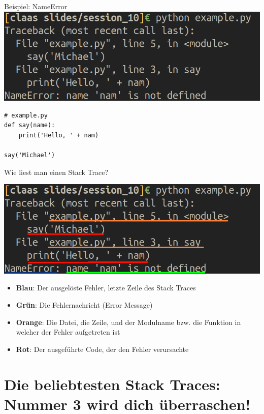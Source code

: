\begin{frame}[fragile]{Beispiel: NameError}
\includegraphics[width=\textwidth]{stack_trace_example.png}
\begin{lstlisting}
# example.py
def say(name):
    print('Hello, ' + nam)

say('Michael')
\end{lstlisting}
\end{frame}

\begin{frame}[fragile]{Wie liest man einen Stack Trace?}
\begin{center}
\includegraphics[width=.9\textwidth]{stack_trace_example_colored.png}
\end{center}
\begin{itemize}
    \item \textbf{Blau}: Der ausgelöste Fehler, letzte Zeile des Stack Traces
    \item \textbf{Grün}: Die Fehlernachricht (Error Message)
    \item \textbf{Orange}: Die Datei, die Zeile, und der Modulname bzw. die Funktion in welcher der Fehler aufgetreten ist
    \item \textbf{Rot}: Der ausgeführte Code, der den Fehler verursachte
\end{itemize}
\end{frame}

\section{Die beliebtesten Stack Traces: Nummer 3 wird dich überraschen!}

